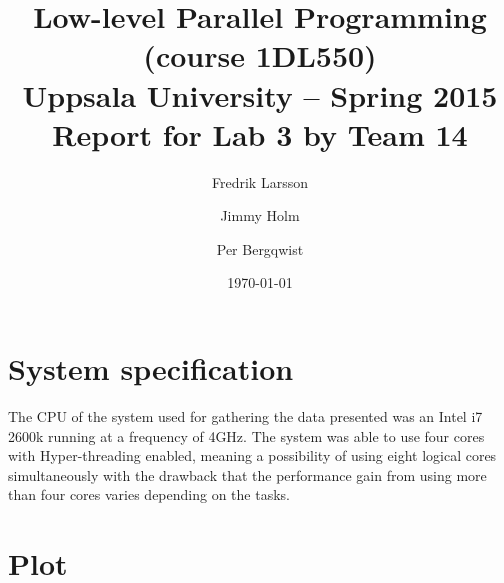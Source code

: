 \documentclass[a4paper,11pt]{article}
\title{\textbf{Low-level Parallel Programming (course 1DL550) \\
    Uppsala University -- Spring 2015 \\
    Report for Lab 3 by Team 14}}
\author{Fredrik Larsson \and Jimmy Holm \and Per Bergqwist}
\date{\today}
\begin{document}
\maketitle
\section{System specification}
The CPU of the system used for gathering the data presented was an
Intel i7 2600k running at a frequency of 4GHz. The system was able to
use four cores with Hyper-threading enabled, meaning a possibility of
using eight logical cores simultaneously with the drawback that the
performance gain from using more than four cores varies depending on
the tasks.
\section{Plot}
\end{document}
